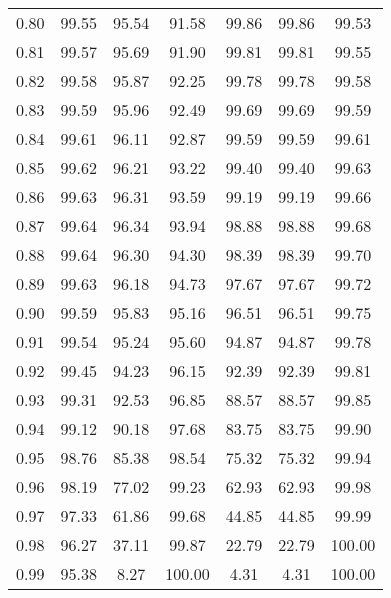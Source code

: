\begin{tabular}{|c|c|c|c|c|c|c|}
      0.80 &     99.55 &     95.54 &      91.58 &   99.86 &      99.86 &         99.53 \\
      0.81 &     99.57 &     95.69 &      91.90 &   99.81 &      99.81 &         99.55 \\
      0.82 &     99.58 &     95.87 &      92.25 &   99.78 &      99.78 &         99.58 \\
      0.83 &     99.59 &     95.96 &      92.49 &   99.69 &      99.69 &         99.59 \\
      0.84 &     99.61 &     96.11 &      92.87 &   99.59 &      99.59 &         99.61 \\
      0.85 &     99.62 &     96.21 &      93.22 &   99.40 &      99.40 &         99.63 \\
      0.86 &     99.63 &     96.31 &      93.59 &   99.19 &      99.19 &         99.66 \\
      0.87 &     99.64 &     96.34 &      93.94 &   98.88 &      98.88 &         99.68 \\
      0.88 &     99.64 &     96.30 &      94.30 &   98.39 &      98.39 &         99.70 \\
      0.89 &     99.63 &     96.18 &      94.73 &   97.67 &      97.67 &         99.72 \\
      0.90 &     99.59 &     95.83 &      95.16 &   96.51 &      96.51 &         99.75 \\
      0.91 &     99.54 &     95.24 &      95.60 &   94.87 &      94.87 &         99.78 \\
      0.92 &     99.45 &     94.23 &      96.15 &   92.39 &      92.39 &         99.81 \\
      0.93 &     99.31 &     92.53 &      96.85 &   88.57 &      88.57 &         99.85 \\
      0.94 &     99.12 &     90.18 &      97.68 &   83.75 &      83.75 &         99.90 \\
      0.95 &     98.76 &     85.38 &      98.54 &   75.32 &      75.32 &         99.94 \\
      0.96 &     98.19 &     77.02 &      99.23 &   62.93 &      62.93 &         99.98 \\
      0.97 &     97.33 &     61.86 &      99.68 &   44.85 &      44.85 &         99.99 \\
      0.98 &     96.27 &     37.11 &      99.87 &   22.79 &      22.79 &        100.00 \\
      0.99 &     95.38 &      8.27 &     100.00 &    4.31 &       4.31 &        100.00 \\
\bottomrule
\end{tabular}
